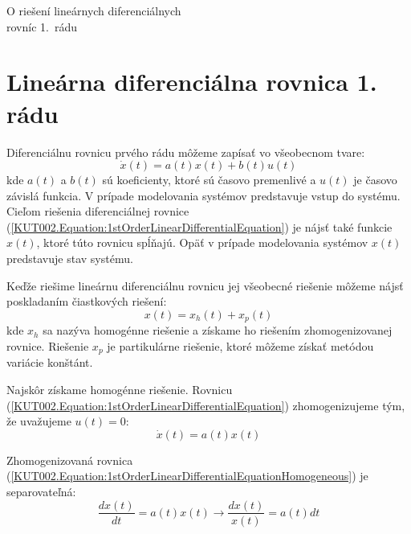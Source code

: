 \documentclass[a4paper, 10pt, ]{article}
\newcommand{\der}[2]{\frac{d #1}{d #2}}
\theoremstyle{definition}
\begin{document}
\begin{flushleft}
	O riešení lineárnych diferenciálnych \\ rovníc 1.~rádu
\end{flushleft}

\bigskip

\normalsize
\normalfont



\section{Lineárna diferenciálna rovnica 1. rádu}

Diferenciálnu rovnicu prvého rádu môžeme zapísať vo všeobecnom tvare:
\begin{equation}
    \label{KUT002.Equation:1stOrderLinearDifferentialEquation}
    \dot{x}(t) = a(t) x(t) + b(t) u(t)
\end{equation}
kde $a(t)$ a $b(t)$ sú koeficienty, ktoré sú časovo premenlivé a $u(t)$ je časovo závislá funkcia. V prípade modelovania systémov predstavuje vstup do systému. Cieľom riešenia diferenciálnej rovnice (\ref{KUT002.Equation:1stOrderLinearDifferentialEquation}) je nájsť také funkcie $x(t)$, ktoré túto rovnicu spĺňajú. Opäť v prípade modelovania systémov $x(t)$ predstavuje stav systému.

Keďže riešime lineárnu diferenciálnu rovnicu jej všeobecné riešenie môžeme nájsť poskladaním čiastkových riešení:
\begin{equation}
    x(t) = x_h(t) + x_p(t)
\end{equation}
kde $x_h$ sa nazýva homogénne riešenie a získame ho riešením zhomogenizovanej rovnice. Riešenie $x_p$ je partikulárne riešenie, ktoré môžeme získať metódou variácie konštánt.

Najskôr získame homogénne riešenie. Rovnicu (\ref{KUT002.Equation:1stOrderLinearDifferentialEquation}) zhomogenizujeme tým, že uvažujeme $u(t) = 0$:
\begin{equation}
    \label{KUT002.Equation:1stOrderLinearDifferentialEquationHomogeneous}
    \dot{x}(t) = a(t) x(t)
\end{equation}

Zhomogenizovaná rovnica (\ref{KUT002.Equation:1stOrderLinearDifferentialEquationHomogeneous}) je separovateľná:
\begin{equation}
    \label{KUT002.Equation:1stOrderLinearDifferentialEquationHomogeneousSeparated}
    \der{x(t)}{t} = a(t) x(t) \longrightarrow \frac{dx(t)}{x(t)} = a(t)dt
\end{equation}
\end{document}
